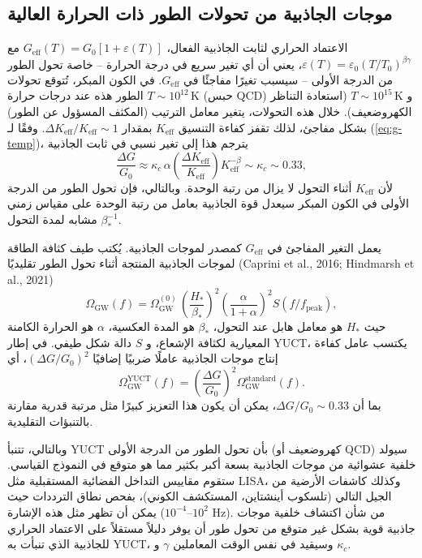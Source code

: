 \documentclass[11pt,a4paper]{article}
\newcommand{\Keff}{K_{\mathrm{eff}}}
\newcommand{\eps}{\varepsilon}
\begin{document}
	\subsection{موجات الجاذبية من تحولات الطور ذات الحرارة العالية}
	\label{subsec:gw}
	
	الاعتماد الحراري لثابت الجاذبية الفعال، $G_{\mathrm{eff}}(T)=G_0[1+\eps(T)]$ مع $\eps(T)=\eps_0(T/T_0)^{\beta\gamma}$، يعني أن أي تغير سريع في درجة الحرارة – خاصة تحول الطور من الدرجة الأولى – سيسبب تغيرًا مفاجئًا في $G_{\mathrm{eff}}$. في الكون المبكر، تُتوقع تحولات الطور هذه عند درجات حرارة $T\sim 10^{12}\,\mathrm{K}$ (حبس QCD) و $T\sim 10^{15}\,\mathrm{K}$ (استعادة التناظر الكهروضعيف). خلال هذه التحولات، يتغير معامل الترتيب (المكثف المسؤول عن الطور) بشكل مفاجئ، لذلك تقفز كفاءة التنسيق $\Keff$ بمقدار $\Delta\Keff/\Keff\sim 1$. وفقًا لـ (\ref{eq:g-temp})، يترجم هذا إلى تغير نسبي في ثابت الجاذبية
	\begin{equation}
		\frac{\Delta G}{G_0} \approx \kappa_c\,\alpha \left(\frac{\Delta\Keff}{\Keff}\right) 
		\Keff^{-\beta} \sim \kappa_c \sim 0.33,
		\label{eq:deltaG-phase}
	\end{equation}
	لأن $\Keff$ أثناء التحول لا يزال من رتبة الوحدة. وبالتالي، فإن تحول الطور من الدرجة الأولى في الكون المبكر سيعدل قوة الجاذبية بعامل من رتبة الوحدة على مقياس زمني مشابه لمدة التحول $\beta_*^{-1}$.
	
	يعمل التغير المفاجئ في $G_{\mathrm{eff}}$ كمصدر لموجات الجاذبية. يُكتب طيف كثافة الطاقة لموجات الجاذبية المنتجة أثناء تحول الطور تقليديًا (Caprini et al., 2016; Hindmarsh et al., 2021)
	\begin{equation}
		\Omega_{\mathrm{GW}}(f) = \Omega_{\mathrm{GW}}^{(0)} \,
		\left(\frac{H_*}{\beta_*}\right)^2 \left(\frac{\alpha}{1+\alpha}\right)^2 
		S(f/f_{\mathrm{peak}}),
	\end{equation}
	حيث $H_*$ هو معامل هابل عند التحول، $\beta_*$ هو المدة العكسية، $\alpha$ هو الحرارة الكامنة المعيارية لكثافة الإشعاع، و $S$ دالة شكل طيفي. في إطار YUCT، يكتسب عامل كفاءة إنتاج موجات الجاذبية عاملًا ضربيًا إضافيًا $(\Delta G/G_0)^2$، أي
	\begin{equation}
		\Omega_{\mathrm{GW}}^{\mathrm{YUCT}}(f) = \left(\frac{\Delta G}{G_0}\right)^2 
		\Omega_{\mathrm{GW}}^{\mathrm{standard}}(f).
	\end{equation}
	بما أن $\Delta G/G_0\sim 0.33$، يمكن أن يكون هذا التعزيز كبيرًا مثل مرتبة قدرية مقارنة بالتنبؤات التقليدية.
	
	وبالتالي، تتنبأ YUCT بأن تحول الطور من الدرجة الأولى (كهروضعيف أو QCD) سيولد خلفية عشوائية من موجات الجاذبية بسعة أكبر بكثير مما هو متوقع في النموذج القياسي. ستقوم مقاييس التداخل الفضائية المستقبلية مثل LISA، وكذلك كاشفات الأرضية من الجيل التالي (تلسكوب أينشتاين، المستكشف الكوني)، بفحص نطاق الترددات حيث يمكن أن تظهر مثل هذه الإشارة ($10^{-4}$–$10^{2}$ Hz). من شأن اكتشاف خلفية موجات جاذبية قوية بشكل غير متوقع من تحول طور أن يوفر دليلاً مستقلاً على الاعتماد الحراري للجاذبية الذي تنبأت به YUCT، وسيقيد في نفس الوقت المعاملين $\gamma$ و $\kappa_c$.
	
\end{document}

